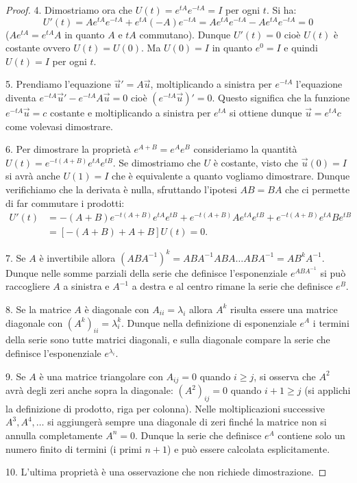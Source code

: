 \begin{theorem}
\begin{proof}
4. Dimostriamo ora che $U(t) = e^{tA}e^{-tA}=I$ per ogni $t$. Si ha:
\[
 U'(t) = A e^{tA}e^{-tA} + e^{tA}(-A)e^{-tA}
       = A e^{tA}e^{-tA} - A e^{tA}e^{-tA} = 0
\]
($Ae^{tA} = e^{tA}A$ in quanto $A$ e $tA$ commutano).
Dunque $U'(t)=0$ cioè $U(t)$ è costante ovvero $U(t)=U(0)$. Ma $U(0)=I$
in quanto $e^0=I$ e quindi $U(t)=I$ per ogni $t$.

5. Prendiamo l'equazione $\vec u' = A\vec u$, moltiplicando a sinistra per
$e^{-tA}$ l'equazione diventa
$e^{-tA} \vec u' - e^{-tA} A \vec u=0$ cioè $(e^{-tA} \vec u)' = 0$. Questo significa
che la funzione $e^{-tA}\vec u = c$ costante e moltiplicando a sinistra per
$e^{tA}$ si ottiene dunque $\vec u = e^{tA}c$ come volevasi dimostrare.

6. Per dimostrare la proprietà $e^{A+B}=e^A e^B$ consideriamo la quantità
$U(t) = e^{-t(A+B)} e^{tA} e^{tB}$. Se dimostriamo che $U$ è costante,
visto che $\vec u(0)=I$ si avrà anche $U(1)=I$ che è equivalente a quanto
vogliamo dimostrare. Dunque verifichiamo che la derivata è nulla,
sfruttando l'ipotesi $AB=BA$ che ci permette di far commutare i prodotti:
\begin{align*}
U'(t) & = -(A+B)e^{-t(A+B)} e^{tA} e^{tB} + e^{-t(A+B)}Ae^{tA}e^{tB} +
e^{-t(A+B)}e^{tA} B e^{tB} \\
& = [-(A+B) + A + B] U(t) = 0.
\end{align*}

7. Se $A$ è invertibile allora $(ABA^{-1})^k = ABA^{-1}ABA\dots ABA^{-1}
= AB^k A^{-1}$. Dunque nelle somme parziali della serie che definisce l'esponenziale
$e^{ABA^{-1}}$ si può raccogliere $A$ a sinistra e $A^{-1}$ a destra e
al centro rimane la serie che definisce $e^B$.

8. Se la matrice $A$ è diagonale con $A_{ii}=\lambda_i$ allora $A^k$
risulta essere una matrice diagonale con $(A^k)_{ii} =
\lambda_i^k$. Dunque nella definizione di esponenziale $e^A$ i termini
della serie sono tutte matrici diagonali, e sulla diagonale compare la
serie che definisce l'esponenziale $e^{\lambda_i}$.

9. Se $A$ è una matrice triangolare con $A_{ij}=0$ quando $i\ge j$, si
osserva che $A^2$ avrà degli zeri anche sopra la diagonale:
$(A^2)_{ij}=0$ quando $i+1\ge j$ (si applichi la definizione di
prodotto, riga per colonna). Nelle moltiplicazioni successive $A^3,
A^4,\dots$ si aggiungerà sempre una diagonale di zeri finché la matrice non
si annulla completamente $A^n=0$. Dunque la serie che definisce $e^A$
contiene solo un numero finito di termini (i primi $n+1$) e può essere
calcolata esplicitamente.

10. L'ultima proprietà è una osservazione che non richiede dimostrazione.
\end{proof}
\end{theorem}

